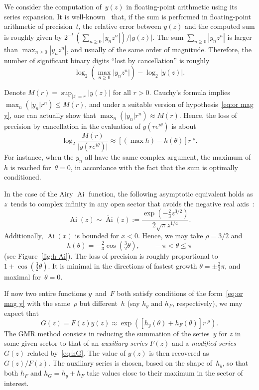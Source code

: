 \documentclass[10pt, conference]{IEEEtran}
\DeclareMathOperator{\Ai}{Ai}
\newcommand{\abs}[1]{\mathopen|#1\mathclose|}
\newcommand{\assign}{:=}
\begin{document}
We consider the computation of~$y(z)$ in floating-point
arithmetic using its series expansion. It is well-known~\cite{Chevillard2012} that, if the sum is performed in floating-point arithmetic of precision~$t$, the relative error between $y(z)$ and the computed sum is roughly given by $2^{-t}\,(\sum_{n \ge 0} |y_n z^n|)/|y(z)|$. The sum $\sum_{n \ge 0} |y_n z^n|$ is larger than $\max_{n\ge 0} |y_n z^n|$, and usually of the same order of magnitude. Therefore, the number of significant binary digits ``lost by cancellation'' is roughly
\[ \log_2(\max_{n \geq 0}  \abs{y_n z^n}) - \log_2
   \abs{y(z)} . \]

Denote
$M(r) = \sup_{\abs{z} = r} \abs{y(z)}$
for all $r>0$.
Cauchy's formula implies $\max_n (\abs{y_n} r^n)
\leq M(r)$, and under a suitable version of
hypothesis~\eqref{eq:or mag y}, one can actually show that $\max_n (
\abs{y_n} r^n) \approx M(r)$. Hence, the loss of
precision by cancellation in the evaluation of $y(re^{i \theta}
)$ is about
\[ \log_2 \frac{M(r)}{\abs{y(re^{i \theta})
  }} \approx \left[(\max h) - h(\theta)
   \right] r^{\;\rho} . \]
For instance, when the $y_n$ all have the same complex argument, the maximum
of~$h$ is reached for~$\theta = 0$, in accordance with the fact that the sum
is optimally conditioned.

In the case of the Airy $\Ai$ function, the following asymptotic
equivalent holds as $z$~tends to complex infinity in any open sector that
avoids the negative real axis~{\cite[Eq.~9.7.5]{DLMF}}:
\begin{equation}
  \Ai(z) \sim \widetilde{\Ai}(z)
  \assign \frac{\exp(- \frac{2}{3} z^{3 / 2})}{2 \sqrt{\pi}
  z^{1 / 4}} \label{eq:Ai-tilde} .
\end{equation}
Additionally, $\Ai(x)$ is bounded for $x < 0$. Hence, we
may take $\rho = 3 / 2$ and
\begin{equation}
  h(\theta) = - \tfrac{2}{3} \cos (\tfrac32 \theta),
  \hspace{2em} - \pi < \theta \leq \pi \label{eq:h Ai}
\end{equation}
(see Figure~\ref{fig:h Ai}). The loss of precision is roughly proportional to
$1 + \cos (\frac{3}{2} \theta)$. It is minimal in the directions of fastest
growth $\theta = \pm \frac{2}{3} \pi$, and maximal for~$\theta = 0$.

If now two entire functions $y$~and~$F$ both satisfy conditions of the
form~\eqref{eq:or mag y} with the same~$\rho$ but different~$h$ (say $h_y$ and
$h_F$, respectively), we may expect that
\begin{equation}
  G(z) = F(z) y(z) \approx \exp
 ([h_y(\theta) + h_F(\theta)]
  r^{\;\rho}) . \label{eq:hG}
\end{equation}
The GMR method consists in reducing the summation of the series~$y$ for $z$ in
some given sector to that of an {\emph{auxiliary series}} $F(z)$
and a {\emph{modified series}} $G(z)$ related by~\eqref{eq:hG}.
The value of $y(z)$ is then recovered as $G(z) / F
(z)$. The auxiliary series is chosen, based on the shape
of~$h_y$, so that both $h_F$ and $h_G = h_y + h_F$ take values close to their
maximum in the sector of interest.
\end{document}
